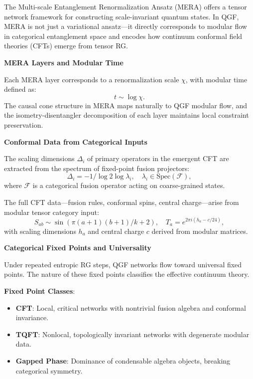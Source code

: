 \documentclass[11pt]{article}
\def\frac#1#2{#1/#2}
\def\left{}
\def\right{}
\begin{document}
The Multi-scale Entanglement Renormalization Ansatz (MERA) offers a tensor network framework for constructing scale-invariant quantum states. In QGF, MERA is not just a variational ansatz—it directly corresponds to modular flow in categorical entanglement space and encodes how continuum conformal field theories (CFTs) emerge from tensor RG.

\vspace{0.5em}
\noindent\textbf{MERA Layers and Modular Time}

Each MERA layer corresponds to a renormalization scale \( \chi \), with modular time defined as:
\[
t \sim \log \chi.
\]
The causal cone structure in MERA maps naturally to QGF modular flow, and the isometry-disentangler decomposition of each layer maintains local constraint preservation.

\vspace{0.5em}
\noindent\textbf{Conformal Data from Categorical Inputs}

The scaling dimensions \( \Delta_i \) of primary operators in the emergent CFT are extracted from the spectrum of fixed-point fusion projectors:
\[
\Delta_i = -\frac{1}{\log 2} \log \lambda_i, \quad \lambda_i \in \text{Spec}(\mathcal{F}),
\]
where \( \mathcal{F} \) is a categorical fusion operator acting on coarse-grained states.

The full CFT data—fusion rules, conformal spins, central charge—arise from modular tensor category input:
\[
S_{ab} \sim \sin\left( \frac{\pi (a+1)(b+1)}{k+2} \right), \quad
T_a = e^{2\pi i (h_a - c/24)},
\]
with scaling dimensions \( h_a \) and central charge \( c \) derived from modular matrices.

\vspace{0.5em}
\noindent\textbf{Categorical Fixed Points and Universality}

Under repeated entropic RG steps, QGF networks flow toward universal fixed points. The nature of these fixed points classifies the effective continuum theory.

\vspace{0.5em}
\noindent\textbf{Fixed Point Classes}:
\begin{itemize}
  \item \textbf{CFT}: Local, critical networks with nontrivial fusion algebra and conformal invariance.
  \item \textbf{TQFT}: Nonlocal, topologically invariant networks with degenerate modular data.
  \item \textbf{Gapped Phase}: Dominance of condensable algebra objects, breaking categorical symmetry.
\end{itemize}
\end{document}
